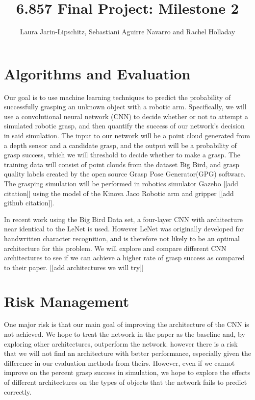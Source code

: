 \documentclass[letterpaper, 10 pt]{article}
\begin{document}
\title{6.857 Final Project: Milestone 2}
\author{Laura Jarin-Lipschitz, Sebastiani Aguirre Navarro and Rachel Holladay}
\maketitle

\section{Algorithms and Evaluation}

Our goal is to use machine learning techniques to predict the probability of successfully grasping an unknown object with a robotic arm. Specifically, we will use a convolutional neural network (CNN) to decide whether or not to attempt a simulated robotic grasp, and then quantify the success of our network's decision in said simulation. The input to our network will be a point cloud generated from a depth sensor and a candidate grasp, and the output will be a probability of grasp success, which we will threshold to decide whether to make a grasp. The training data will consist of point clouds from the dataset Big Bird\cite{singh2014bigbird}, and grasp quality labels created by the open source Grasp Pose Generator(GPG) software\cite{pas2017grasp}. The grasping simulation will be performed in robotics simulator Gazebo [[add citation]] using the model of the Kinova Jaco Robotic arm and gripper [[add github citation]].

In recent work using the Big Bird Data set\cite{pas2017grasp}, a four-layer CNN with architecture near identical to the LeNet\cite{lecun1998gradient} is used. However LeNet was originally developed for handwritten character recognition, and is therefore not likely to be an optimal architecture for this problem. We will explore and compare different CNN architectures to see if we can achieve a higher rate of grasp success as compared to their paper. [[add architectures we will try]]


\section{Risk Management}

One major risk is that our main goal of improving the architecture of the CNN is not achieved. We hope to treat the network in the paper as the baseline and, by exploring other architectures, outperform the network. however there is a risk that we will not find an architecture with better performance, especially given the difference in our evaluation methods from theirs. However, even if we cannot improve on the percent grasp success in simulation, we hope to explore the effects of different architectures on the types of objects that the network fails to predict correctly. 
\end{document}
